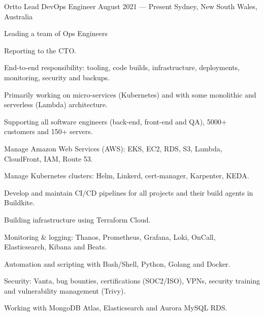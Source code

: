 
\begin{experiences}

  \expitem
  {Ortto} %
  {Lead DevOps Engineer} %
  {August 2021 --- Present} %
  {Sydney, New South Wales, Australia} %
  {
    \begin{cvitems}
      \item {Leading a team of Ops Engineers}
      \item {Reporting to the CTO.}
      \item {End-to-end responsibility: tooling, code builds, infrastructure, deployments, monitoring, security and backups.}
      \item {Primarily working on micro-services (Kubernetes) and with some monolithic and serverless (Lambda) architecture.}
      \item {Supporting all software engineers (back-end, front-end and QA), 5000+ customers and 150+ servers.}
    \end{cvitems}
  }
  {
    \begin{cvitems}
      \item {Manage Amazon Web Services (AWS): EKS, EC2, RDS, S3, Lambda, CloudFront, IAM, Route 53.}
      \item {Manage Kubernetes clusters: Helm, Linkerd, cert-manager, Karpenter, KEDA.}
      \item {Develop and maintain CI/CD pipelines for all projects and their build agents in Buildkite.}
      \item {Building infrastructure using Terraform Cloud.}
      \item {Monitoring \& logging: Thanos, Prometheus, Grafana, Loki, OnCall, Elasticsearch, Kibana and Beats.}
      \item {Automation and scripting with Bash/Shell, Python, Golang and Docker.}
      \item {Security: Vanta, bug bounties, certifications (SOC2/ISO), VPNs, security training and vulnerability management (Trivy).}
      \item {Working with MongoDB Atlas, Elasticsearch and Aurora MySQL RDS.}

\end{cvitems}}
\end{experiences}
